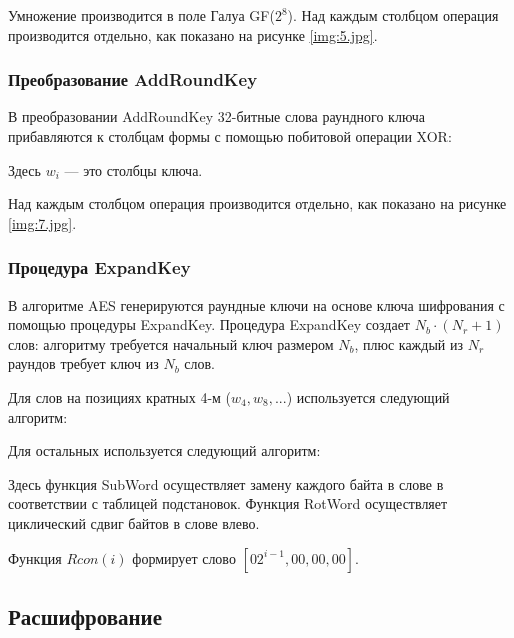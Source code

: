 
Умножение производится в поле Галуа GF($2^8$).
Над каждым столбцом операция производится отдельно, как показано на рисунке \ref{img:5.jpg}.


\subsubsection*{Преобразование AddRoundKey}

В преобразовании AddRoundKey 32-битные слова раундного ключа прибавляются к столбцам формы с помощью побитовой операции XOR:


Здесь $w_i$ — это столбцы ключа.

Над каждым столбцом операция производится отдельно, как показано на рисунке \ref{img:7.jpg}.


\subsubsection*{Процедура ExpandKey}
В алгоритме AES генерируются раундные ключи на основе ключа шифрования с помощью процедуры ExpandKey. Процедура ExpandKey создает $N_b \cdot (N_r + 1)$ слов: алгоритму требуется начальный ключ размером $N_b$, плюс каждый из $N_r$ раундов требует ключ из $N_b$ слов.


Для слов на позициях кратных 4-м ($w_4, w_8, ...$) используется следующий алгоритм:


Для остальных используется следующий алгоритм:


Здесь функция SubWord осуществляет замену каждого байта в слове в соответствии с таблицей подстановок.
Функция RotWord осуществляет циклический сдвиг байтов в слове влево.

Функция $Rcon(i)$ формирует слово $[02^{i-1}, 00, 00, 00]$.


\subsection{Расшифрование}


